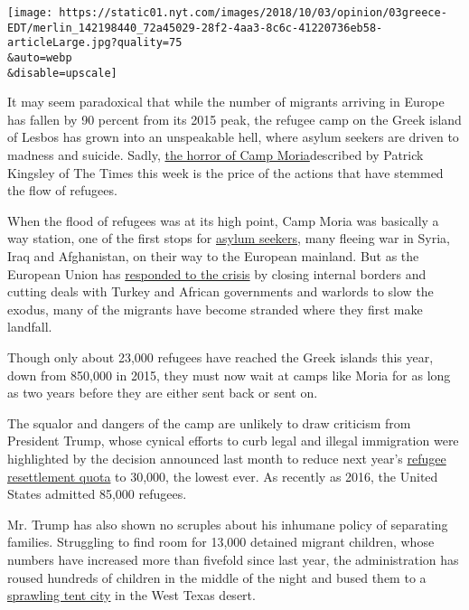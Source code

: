 \texttt{[image: https://static01.nyt.com/images/2018/10/03/opinion/03greece-EDT/merlin\_142198440\_72a45029-28f2-4aa3-8c6c-41220736eb58-articleLarge.jpg?quality=75\\\&auto=webp\\\&disable=upscale]}

It may seem paradoxical that while the number of migrants arriving in
Europe has fallen by 90 percent from its 2015 peak, the refugee camp on
the Greek island of Lesbos has grown into an unspeakable hell, where
asylum seekers are driven to madness and suicide. Sadly,
\href{https://www.nytimes.com/2018/10/02/world/europe/greece-lesbos-moria-refugees.html}{the
horror of Camp Moria}described by Patrick Kingsley of The Times this
week is the price of the actions that have stemmed the flow of refugees.

When the flood of refugees was at its high point, Camp Moria was
basically a way station, one of the first stops for
\href{https://www.nytimes.com/2015/10/08/world/europe/refugee-migrant-crisis-asylum-seekers-germany.html}{asylum
seekers}, many fleeing war in Syria, Iraq and Afghanistan, on their way
to the European mainland. But as the European Union has
\href{https://www.nytimes.com/interactive/2018/06/27/world/europe/europe-migrant-crisis-change.html}{responded
to the crisis} by closing internal borders and cutting deals with Turkey
and African governments and warlords to slow the exodus, many of the
migrants have become stranded where they first make landfall.

Though only about 23,000 refugees have reached the Greek islands this
year, down from 850,000 in 2015, they must now wait at camps like Moria
for as long as two years before they are either sent back or sent on.

The squalor and dangers of the camp are unlikely to draw criticism from
President Trump, whose cynical efforts to curb legal and illegal
immigration were highlighted by the decision announced last month to
reduce next year's
\href{https://www.nytimes.com/2018/09/17/us/politics/trump-refugees-historic-cuts.html}{refugee
resettlement quota} to 30,000, the lowest ever. As recently as 2016, the
United States admitted 85,000 refugees.

Mr. Trump has also shown no scruples about his inhumane policy of
separating families. Struggling to find room for 13,000 detained migrant
children, whose numbers have increased more than fivefold since last
year, the administration has roused hundreds of children in the middle
of the night and bused them to a
\href{https://www.nytimes.com/2018/09/30/us/migrant-children-tent-city-texas.html}{sprawling
tent city} in the West Texas desert.

